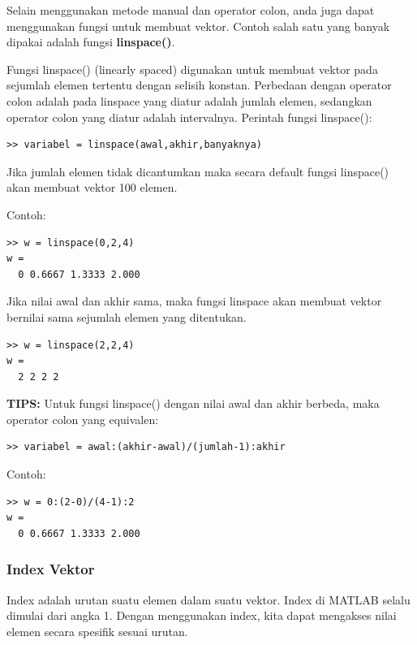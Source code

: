\documentclass[12pt]{book}
\begin{document}
	Selain menggunakan metode manual dan operator colon, anda juga dapat menggunakan fungsi untuk membuat vektor.
	Contoh salah satu yang banyak dipakai adalah fungsi \textbf{linspace()}.

	Fungsi linspace() (linearly spaced) digunakan untuk membuat vektor pada sejumlah elemen tertentu dengan selisih konstan.
	Perbedaan dengan operator colon adalah pada linspace yang diatur adalah jumlah elemen, sedangkan operator colon yang diatur adalah intervalnya.
	Perintah fungsi linspace():
	\begin{verbatim}
>> variabel = linspace(awal,akhir,banyaknya)
	\end{verbatim}

	Jika jumlah elemen tidak dicantumkan maka secara default fungsi linspace() akan membuat vektor 100 elemen.

	Contoh:
	\begin{verbatim}
>> w = linspace(0,2,4)
w =
  0 0.6667 1.3333 2.000
	\end{verbatim}

	Jika nilai awal dan akhir sama, maka fungsi linspace akan membuat vektor bernilai sama sejumlah elemen yang ditentukan.
	\begin{verbatim}
>> w = linspace(2,2,4)
w =
  2 2 2 2
	\end{verbatim}

	\textbf{TIPS:} Untuk fungsi linspace() dengan nilai awal dan akhir berbeda, maka operator colon yang equivalen:
	\begin{verbatim}
>> variabel = awal:(akhir-awal)/(jumlah-1):akhir
	\end{verbatim}

	\newpage
	Contoh:
	\begin{verbatim}
>> w = 0:(2-0)/(4-1):2
w =
  0 0.6667 1.3333 2.000
	\end{verbatim}

	\subsubsection{Index Vektor}

	Index adalah urutan suatu elemen dalam suatu vektor.
	Index di MATLAB selalu dimulai dari angka 1.
	Dengan menggunakan index, kita dapat mengakses nilai elemen secara spesifik sesuai urutan.
\end{document}
